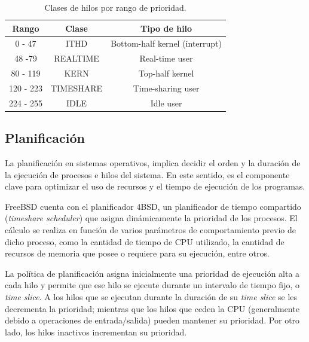 \begin{table}[H]
    \centering
    \begin{tabular}{|c|c|c|}
        \hline
        \textbf{Rango} & \textbf{Clase} & \textbf{Tipo de hilo}          \\
        \hline
        0 - 47         & ITHD           & Bottom-half kernel (interrupt) \\
        \hline
        48 -79         & REALTIME       & Real-time user                 \\
        \hline
        80 - 119       & KERN           & Top-half kernel                \\
        \hline
        120 - 223      & TIMESHARE      & Time-sharing user              \\
        \hline
        224 - 255      & IDLE           & Idle user                      \\
        \hline
    \end{tabular}
    \caption{Clases de hilos por rango de prioridad.}
    \label{tabla:prio-hilos}
\end{table}


\subsection{Planificación}

La planificación en sistemas operativos, implica decidir el orden y la duración de la ejecución de procesos e hilos del sistema. En este sentido, es el componente clave para optimizar el uso de recursos y el tiempo de ejecución de los programas.\par

FreeBSD cuenta con el planificador 4BSD, un planificador de tiempo compartido (\textit{timeshare scheduler}) que asigna dinámicamente la prioridad de los procesos. El cálculo se realiza en función de varios parámetros de comportamiento previo de dicho proceso, como la cantidad de tiempo de CPU utilizado, la cantidad de recursos de memoria que posee o requiere para su ejecución, entre otros.\par

La política de planificación asigna inicialmente una prioridad de ejecución alta a cada hilo y permite que ese hilo se ejecute durante un intervalo de tiempo fijo, o \textit{time slice}. A los hilos que se ejecutan durante la duración de su \textit{time slice} se les decrementa la prioridad; mientras que los hilos que ceden la CPU (generalmente debido a operaciones de entrada/salida) pueden mantener su prioridad. Por otro lado, los hilos inactivos incrementan su prioridad.\par

